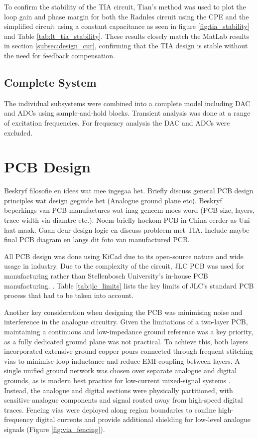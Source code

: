 To confirm the stability of the TIA circuit, Tian's method was used to plot the loop gain and phase margin for both the Radnles circuit using the \ac{CPE} and the simplified circuit using a constant capacitance as seen in figure \ref{fig:tia_stability} and Table \ref{tab:lt_tia_stability}. These results closely match the MatLab results in section \ref{subsec:design_cur}, confirming that the TIA design is stable without the need for feedback compensation.

\subsection{Complete System}
The individual subsystems were combined into a complete model including DAC and ADCs using sample-and-hold blocks. Transient analysis was done at a range of excitation frequencies. For frequency analysis the DAC and ADCs were excluded.

\section{PCB Design}\label{sec:PCB}
Beskryf filosofie en idees wat mee ingegaa het. Briefly discuss general PCB design principles wat design geguide het (Analogue ground plane etc). Beskryf beperkings van PCB manufactures wat inag geneem moes word (PCB size, layers, trace width via diamtre etc.). Noem briefly hoekom PCB in China eerder as Uni laat maak. Gaan deur design logic en discuss probleem met TIA. Include maybe final PCB diagram en langs dit foto van manufactured PCB.

All PCB design was done using KiCad due to its open-source nature and wide usage in industry. Due to the complexity of the circuit, JLC PCB was used for manufacturing rather than Stellenbosch University's in-house PCB manufacturing. . Table \ref{tab:jlc_limits} lists the key limits of JLC's standard PCB process that had to be taken into account. 

Another key consideration when designing the PCB was minimising noise and interference in the analogue circuitry. Given the limitations of a two-layer PCB, maintaining a continuous and low-impedance ground reference was a key priority, as a fully dedicated ground plane was not practical. To achieve this, both layers incorporated extensive ground copper pours connected through frequent stitching vias to minimise loop inductance and reduce \ac{EMI} coupling between layers. A single unified ground network was chosen over separate analogue and digital grounds, as is modern best practice for low-current mixed-signal systems \cite{WhatAreBasic}. Instead, the analogue and digital sections were physically partitioned, with sensitive analogue components and signal routed away from high-speed digital traces. Fencing vias were deployed along region boundaries to confine high-frequency digital currents and provide additional shielding for low-level analogue signals (Figure \ref{fig:via_fencing}).

